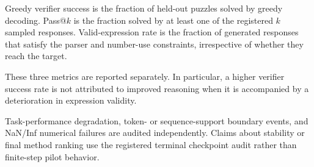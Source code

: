 Greedy verifier success is the fraction of held-out puzzles solved by
greedy decoding. Pass@\(k\) is the fraction solved by at least one of
the registered \(k\) sampled responses. Valid-expression rate is the
fraction of generated responses that satisfy the parser and number-use
constraints, irrespective of whether they reach the target.

These three metrics are reported separately. In particular, a higher
verifier success rate is not attributed to improved reasoning when it
is accompanied by a deterioration in expression validity.

Task-performance degradation, token- or sequence-support boundary
events, and NaN/Inf numerical failures are audited independently.
Claims about stability or final method ranking use the registered
terminal checkpoint audit rather than finite-step pilot behavior.

